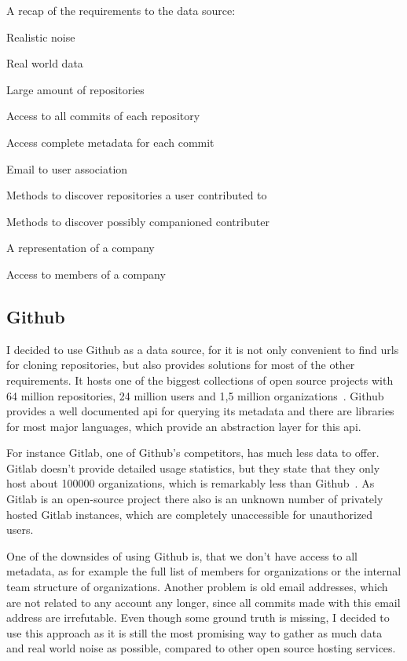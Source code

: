 \begin{itemlist}{A recap of the requirements to the data source:}
    \item Realistic noise
    \item Real world data
    \item Large amount of repositories
    \item Access to all commits of each repository
    \item Access complete metadata for each commit
    \item Email to user association
    \item Methods to discover repositories a user contributed to
    \item Methods to discover possibly companioned contributer
    \item A representation of a company
    \item Access to members of a company
\end{itemlist}


\subsection{Github}
I decided to use Github as a data source, for it is not only convenient to find \acp{url} for cloning repositories, but also provides solutions for most of the other requirements.
It hosts one of the biggest collections of open source projects with 64 million repositories, 24 million users and 1,5 million organizations~\cite{article:github-statistics}.
Github provides a well documented \ac{api} for querying its metadata and there are libraries for most major languages, which provide an abstraction layer for this \ac{api}.


For instance Gitlab, one of Github's competitors, has much less data to offer.
Gitlab doesn't provide detailed usage statistics, but they state that they only host about 100000 organizations, which is remarkably less than Github~\cite{article:gitlab-help}.
As Gitlab is an open-source project there also is an unknown number of privately hosted Gitlab instances, which are completely unaccessible for unauthorized users.

One of the downsides of using Github is, that we don't have access to all metadata, as for example the full list of members for organizations or the internal team structure of organizations.
Another problem is old email addresses, which are not related to any account any longer, since all commits made with this email address are irrefutable.
Even though some ground truth is missing, I decided to use this approach as it is still the most promising way to gather as much data and real world noise as possible, compared to other open source hosting services.

